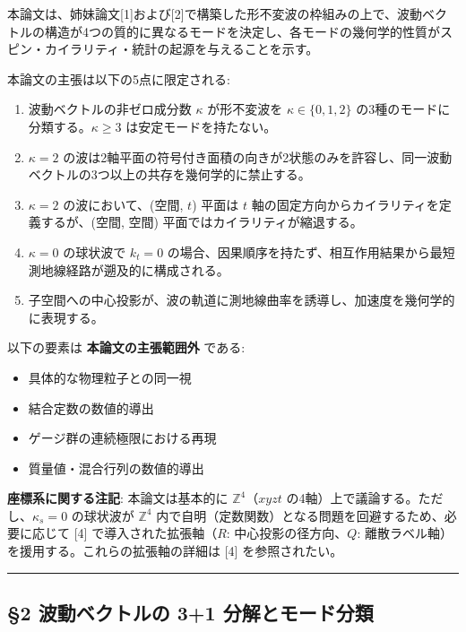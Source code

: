 \documentclass[
  a4paper,11pt]{ltjsarticle}
\providecommand{\tightlist}{%
  \setlength{\itemsep}{0pt}\setlength{\parskip}{0pt}}
\theoremstyle{definition}
\theoremstyle{remark}
\begin{document}
本論文は、姉妹論文{[}1{]}および{[}2{]}で構築した形不変波の枠組みの上で、波動ベクトルの構造が4つの質的に異なるモードを決定し、各モードの幾何学的性質がスピン・カイラリティ・統計の起源を与えることを示す。

本論文の主張は以下の5点に限定される:

\begin{enumerate}
\def\labelenumi{\arabic{enumi}.}
\tightlist
\item
  波動ベクトルの非ゼロ成分数 \(\kappa\) が形不変波を
  \(\kappa \in \{0, 1, 2\}\) の3種のモードに分類する。\(\kappa \geq 3\)
  は安定モードを持たない。
\item
  \(\kappa = 2\)
  の波は2軸平面の符号付き面積の向きが2状態のみを許容し、同一波動ベクトルの3つ以上の共存を幾何学的に禁止する。
\item
  \(\kappa = 2\) の波において、(空間, \(t\)) 平面は \(t\)
  軸の固定方向からカイラリティを定義するが、(空間, 空間)
  平面ではカイラリティが縮退する。
\item
  \(\kappa = 0\) の球状波で \(k_t = 0\)
  の場合、因果順序を持たず、相互作用結果から最短測地線経路が遡及的に構成される。
\item
  子空間への中心投影が、波の軌道に測地線曲率を誘導し、加速度を幾何学的に表現する。
\end{enumerate}

以下の要素は \textbf{本論文の主張範囲外} である:

\begin{itemize}
\tightlist
\item
  具体的な物理粒子との同一視
\item
  結合定数の数値的導出
\item
  ゲージ群の連続極限における再現
\item
  質量値・混合行列の数値的導出
\end{itemize}

\textbf{座標系に関する注記}: 本論文は基本的に \(\mathbb{Z}^4\)（\(xyzt\)
の4軸）上で議論する。ただし、\(\kappa_s = 0\) の球状波が
\(\mathbb{Z}^4\)
内で自明（定数関数）となる問題を回避するため、必要に応じて {[}4{]}
で導入された拡張軸（\(R\): 中心投影の径方向、\(Q\):
離散ラベル軸）を援用する。これらの拡張軸の詳細は {[}4{]}
を参照されたい。

\begin{center}\rule{0.5\linewidth}{0.5pt}\end{center}

\subsection{§2 波動ベクトルの 3+1
分解とモード分類}\label{ux6ce2ux52d5ux30d9ux30afux30c8ux30ebux306e-31-ux5206ux89e3ux3068ux30e2ux30fcux30c9ux5206ux985e}
\end{document}
